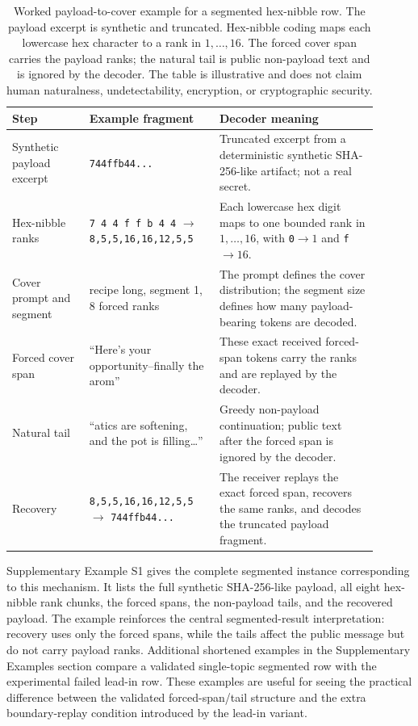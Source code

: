 \documentclass[fleqn,10pt]{wlscirep}
\begin{document}
\begin{table}[ht]
\centering
\scriptsize
\setlength{\tabcolsep}{3pt}
\begin{tabular}{L{0.19\linewidth} L{0.32\linewidth} L{0.39\linewidth}}
\toprule
Step & Example fragment & Decoder meaning \\
\midrule
Synthetic payload excerpt & \texttt{744ffb44...} & Truncated excerpt from a deterministic synthetic SHA-256-like artifact; not a real secret. \\
Hex-nibble ranks & \texttt{7 4 4 f f b 4 4} \(\rightarrow\) \texttt{8,5,5,16,16,12,5,5} & Each lowercase hex digit maps to one bounded rank in \(1,\ldots,16\), with \texttt{0}\(\rightarrow 1\) and \texttt{f}\(\rightarrow 16\). \\
Cover prompt and segment & recipe long, segment 1, 8 forced ranks & The prompt defines the cover distribution; the segment size defines how many payload-bearing tokens are decoded. \\
Forced cover span & ``Here's your opportunity--finally the arom'' & These exact received forced-span tokens carry the ranks and are replayed by the decoder. \\
Natural tail & ``atics are softening, and the pot is filling\ldots{}'' & Greedy non-payload continuation; public text after the forced span is ignored by the decoder. \\
Recovery & \texttt{8,5,5,16,16,12,5,5} \(\rightarrow\) \texttt{744ffb44...} & The receiver replays the exact forced span, recovers the same ranks, and decodes the truncated payload fragment. \\
\bottomrule
\end{tabular}
\caption{\label{tab:examples}Worked payload-to-cover example for a segmented hex-nibble row. The payload excerpt is synthetic and truncated. Hex-nibble coding maps each lowercase hex character to a rank in \(1,\ldots,16\). The forced cover span carries the payload ranks; the natural tail is public non-payload text and is ignored by the decoder. The table is illustrative and does not claim human naturalness, undetectability, encryption, or cryptographic security.}
\end{table}

Supplementary Example S1 gives the complete segmented instance corresponding to this mechanism. It lists the full synthetic SHA-256-like payload, all eight hex-nibble rank chunks, the forced spans, the non-payload tails, and the recovered payload. The example reinforces the central segmented-result interpretation: recovery uses only the forced spans, while the tails affect the public message but do not carry payload ranks.
Additional shortened examples in the Supplementary Examples section compare a validated single-topic segmented row with the experimental failed lead-in row. These examples are useful for seeing the practical difference between the validated forced-span/tail structure and the extra boundary-replay condition introduced by the lead-in variant.
\end{document}
